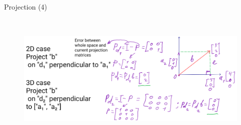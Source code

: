 \documentclass[aspectratio=169]{beamer}
\begin{document}
\begin{frame}[t]{Projection (4)}
    \framesubtitle{}
    \begin{figure}[H]
        \centering\includegraphics[height=6cm,width=1\textwidth,keepaspectratio]{AGLA2_for_slides_4.png}
        \label{fig:AGLA2_for_slides_4.png}
    \end{figure}
\end{frame}
\end{document}
